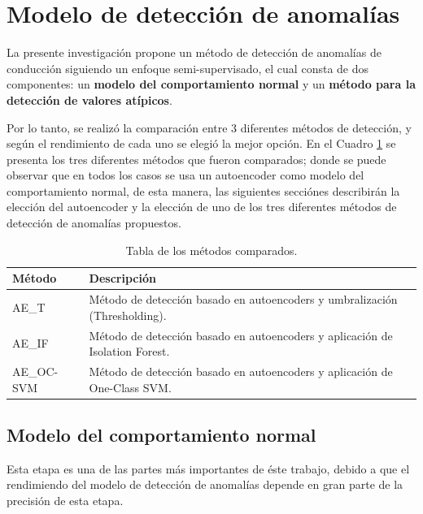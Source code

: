 \section{Modelo de detecci\'{o}n de anomal\'{i}as}

La presente investigaci\'{o}n propone un m\'{e}todo de detecci\'{o}n de anomal\'{i}as de conducci\'{o}n siguiendo un enfoque semi-supervisado, el cual consta de dos componentes: un \textbf{modelo del comportamiento normal} y un \textbf{m\'{e}todo para la detecci\'{o}n de valores at\'{i}picos}.

\vspace{5mm} %

Por lo tanto, se realiz\'{o} la comparaci\'{o}n entre 3 diferentes m\'{e}todos de detecci\'{o}n, y seg\'{u}n el rendimiento de cada uno se elegi\'{o} la mejor opci\'{o}n. En el Cuadro \ref{table:metodos_comparados} se presenta los tres diferentes m\'{e}todos que fueron comparados; donde se puede observar que en todos los casos se usa un autoencoder como modelo del comportamiento normal, de esta manera, las siguientes secci\'{o}nes describir\'{a}n la elecci\'{o}n del autoencoder y la elecci\'{o}n de uno de los tres diferentes m\'{e}todos de detecci\'{o}n de anomal\'{i}as propuestos.

\begin{table}[H]
\centering
\begin{tabular}{|l|p{100mm}|}
\hline
\textbf{M\'{e}todo} & \textbf{Descripci\'{o}n} \\ \hline
AE\_T & M\'{e}todo de detecci\'{o}n basado en autoencoders y umbralizaci\'{o}n (Thresholding). \\ \hline
AE\_IF & M\'{e}todo de detecci\'{o}n basado en autoencoders y aplicaci\'{o}n de Isolation Forest.  \\ \hline
AE\_OC-SVM & M\'{e}todo de detecci\'{o}n basado en autoencoders y aplicaci\'{o}n de One-Class SVM. \\ \hline
\end{tabular}
\caption{Tabla de los m\'{e}todos comparados.}
\label{table:metodos_comparados}
\end{table}

\subsection{Modelo del comportamiento normal}

Esta etapa es una de las partes m\'{a}s importantes de \'{e}ste trabajo, debido a que el rendimiendo del modelo de detecci\'{o}n de anomal\'{i}as depende en gran parte de la precisi\'{o}n de esta etapa.

